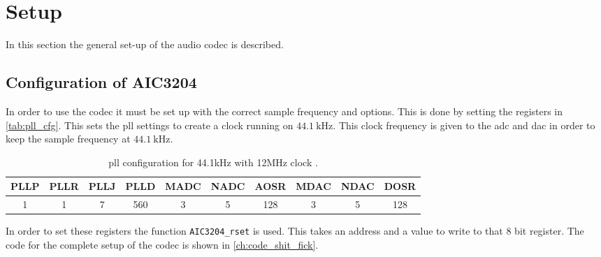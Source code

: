 \section{Setup}
\label{sec:imp_setup}
In this section the general set-up of the audio \gls{codec} is described. 

\subsection{Configuration of AIC3204}
In order to use the \gls{codec} it must be set up with the correct sample frequency and options. This is done by setting the registers in \autoref{tab:pll_cfg}. This sets the \gls{pll} settings to create a clock running on $\SI{44.1}{\kilo \hertz}$. This clock frequency is given to the \gls{adc} and \gls{dac} in order to keep the sample frequency at $\SI{44.1}{\kilo \hertz}$.

\begin{table}[htbp]
\centering
\caption{\gls{pll} configuration for 44.1kHz with 12MHz clock \citep{app_guide_aic3204}.}
\label{tab:pll_cfg}
\begin{tabular}{|l|l|l|l|l|l|l|l|l|l|}
\hline
\textbf{PLLP}           & \textbf{PLLR}          & \textbf{PLLJ}          & \textbf{PLLD}            & \textbf{MADC}          & \textbf{NADC}          & \textbf{AOSR}            & \textbf{MDAC}          & \textbf{NDAC}          & \textbf{DOSR}            \\ \hline
\multicolumn{1}{|c|}{1} & \multicolumn{1}{c|}{1} & \multicolumn{1}{c|}{7} & \multicolumn{1}{c|}{560} & \multicolumn{1}{c|}{3} & \multicolumn{1}{c|}{5} & \multicolumn{1}{c|}{128} & \multicolumn{1}{c|}{3} & \multicolumn{1}{c|}{5} & \multicolumn{1}{c|}{128} \\ \hline
\end{tabular}
\end{table}

In order to set these registers the function \texttt{AIC3204_rset} is used. This takes an address and a value to write to that 8 bit register. The code for the complete setup of the \gls{codec} is shown in \autoref{ch:code_shit_fick}.